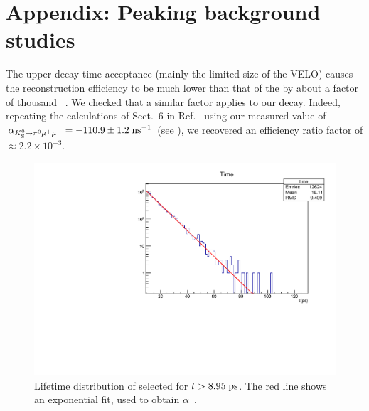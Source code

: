 \clearpage
\newpage

\section{Appendix: Peaking background studies}
\label{app:background}


The upper decay time acceptance (mainly the limited size of the VELO) causes the \KL reconstruction efficiency to be much lower than that of the \KS by about a factor of thousand ~\cite{KsmmANA}. We checked that a similar 
factor applies to our decay. Indeed, repeating the calculations of Sect.~6 in Ref.~\cite{KsmmANA} using our measured value of $\alpha_{K^0_{\mathrm{\scriptscriptstyle S}}\to\pi^0\mu^+\mu^-} = -110.9\pm 1.2 \; \rm ns^{-1}$ (see ), we recovered an efficiency 
ratio factor of $\approx 2.2\times10^{-3}$.

\begin{figure} [htb!]
\begin{center}
\includegraphics[scale=0.3]{figs/lifetime.pdf}
\caption{Lifetime distribution of selected \Kspizmm for $t>8.95\;\rm ps$. The red line shows an exponential fit, used to obtain $\alpha$~\cite{KsmmANA}. \label{fig:lifetime}}
\end{center}
\end{figure}


